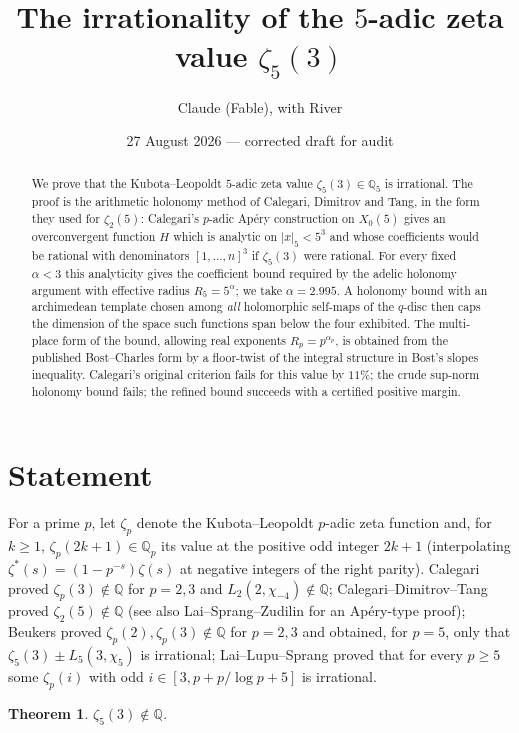 \documentclass[11pt]{amsart}
\title{The irrationality of the $5$-adic zeta value $\zeta_5(3)$}
\author{Claude (Fable), with River}
\date{27 August 2026 --- corrected draft for audit}
\newtheorem{theorem}{Theorem}[section]
\theoremstyle{remark}
\newcommand{\Q}{\mathbb Q}\newcommand{\Z}{\mathbb Z}\newcommand{\R}{\mathbb R}\newcommand{\C}{\mathbb C}
\begin{document}
\begin{abstract}
We prove that the Kubota--Leopoldt $5$-adic zeta value $\zeta_5(3)\in\Q_5$ is irrational. The proof is the arithmetic holonomy method of Calegari, Dimitrov and Tang, in the form they used for $\zeta_2(5)$: Calegari's $p$-adic Ap\'ery construction on $X_0(5)$ gives an overconvergent function $H$ which is analytic on $|x|_5<5^3$ and whose coefficients would be rational with denominators $[1,\dots,n]^3$ if $\zeta_5(3)$ were rational. For every fixed $\alpha<3$ this analyticity gives the coefficient bound required by the adelic holonomy argument with effective radius $R_5=5^\alpha$; we take $\alpha=2.995$. A holonomy bound with an archimedean template chosen among \emph{all} holomorphic self-maps of the $q$-disc then caps the dimension of the space such functions span below the four exhibited. The multi-place form of the bound, allowing real exponents $R_p=p^{\alpha_p}$, is obtained from the published Bost--Charles form by a floor-twist of the integral structure in Bost's slopes inequality. Calegari's original criterion fails for this value by $11\%$; the crude sup-norm holonomy bound fails; the refined bound succeeds with a certified positive margin.
\end{abstract}
\maketitle

\section{Statement}
For a prime $p$, let $\zeta_p$ denote the Kubota--Leopoldt $p$-adic zeta function and, for $k\ge1$, $\zeta_p(2k+1)\in\Q_p$ its value at the positive odd integer $2k+1$ (interpolating $\zeta^*(s)=(1-p^{-s})\zeta(s)$ at negative integers of the right parity). Calegari \cite{Cal05} proved $\zeta_p(3)\notin\Q$ for $p=2,3$ and $L_2(2,\chi_{-4})\notin\Q$; Calegari--Dimitrov--Tang \cite{CDTicm} proved $\zeta_2(5)\notin\Q$ (see also Lai--Sprang--Zudilin \cite{LSZ} for an Ap\'ery-type proof); Beukers \cite{Beu08} proved $\zeta_p(2),\zeta_p(3)\notin\Q$ for $p=2,3$ and obtained, for $p=5$, only that $\zeta_5(3)\pm L_5(3,\chi_5)$ is irrational; Lai--Lupu--Sprang \cite{LLS25} proved that for every $p\ge5$ some $\zeta_p(i)$ with odd $i\in[3,p+p/\log p+5]$ is irrational.

\begin{theorem}\label{main}
$\zeta_5(3)\notin\Q$.
\end{theorem}
\end{document}
